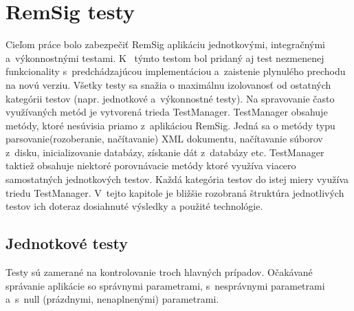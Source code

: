 \documentclass[
  digital, %
  table,   %
oneside,
  nolof,     %
  nolot,     %
]{fithesis3}
\begin{document}
\chapter{RemSig testy}
Cieľom práce bolo zabezpečiť  RemSig aplikáciu jednotkovými, integračnými a~výkonnostnými testami. K~ týmto testom bol pridaný aj test nezmenenej funkcionality s~predchádzajúcou implementáciou a~zaistenie plynulého prechodu na novú verziu. Všetky  testy sa snažia o maximálnu izolovanosť od ostatných kategórii  testov (napr. jednotkové a~výkonnostné testy). Na spravovanie často využívaných metód je vytvorená trieda TestManager. TestManager obsahuje metódy, ktoré nesúvisia priamo z~aplikáciou RemSig. Jedná sa o metódy typu parsovanie(rozoberanie, načítavanie) XML dokumentu, načítavanie súborov z~disku, inicializovanie databázy, získanie dát z~databázy etc. TestManager taktiež obsahuje niektoré porovnávacie metódy ktoré využíva viacero samostatných jednotkových testov. Každá kategória testov do istej miery využíva triedu TestManager. V~tejto kapitole je bližšie rozobraná štruktúra jednotlivých testov ich doteraz dosiahnuté výsledky a použité technológie.
\section{Jednotkové testy}
Testy sú zamerané na kontrolovanie troch hlavných prípadov. Očakávané správanie aplikácie so správnymi parametrami, s~nesprávnymi parametrami a~s~null (prázdnymi, nenaplnenými) parametrami.
\end{document}
